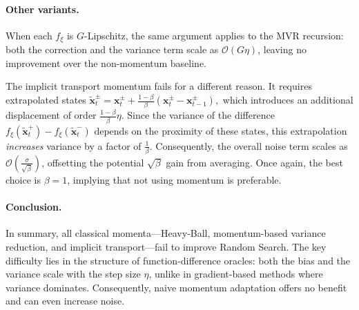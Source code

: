 \documentclass[twoside]{article}
\theoremstyle{plain}
\theoremstyle{definition}
\theoremstyle{remark}
\def\cO{{\mathcal{O}}}
\def\vx{{\bm{x}}}
\begin{document}
\paragraph{Other variants.}
When each $f_\xi$ is $G$-Lipschitz, the same argument applies to the MVR
recursion: both the correction and the variance term scale as
$\cO(G\eta)$, leaving no improvement over the non-momentum baseline.

The implicit transport momentum fails for a different reason.
It requires extrapolated states
\(
\tilde{\vx}_t^\pm = \vx_t^\pm + \tfrac{1-\beta}{\beta}(\vx_t^\pm - \vx_{t-1}^\pm),
\)
which introduces an additional displacement of order
$\tfrac{1-\beta}{\beta}\eta$. Since the variance of the difference
$f_\xi(\tilde{\vx}_t^+) - f_\xi(\tilde{\vx}_t^-)$ depends on the proximity
of these states, this extrapolation \emph{increases} variance by a factor of
$\tfrac{1}{\beta}$. Consequently, the overall noise term scales as
$\cO(\tfrac{\sigma}{\sqrt{\beta}})$, offsetting the potential
$\sqrt{\beta}$ gain from averaging.  
Once again, the best choice is $\beta=1$, implying that not using momentum
is preferable.

\paragraph{Conclusion.}
In summary, all classical momenta---Heavy-Ball, momentum-based variance
reduction, and implicit transport---fail to improve Random Search.  
The key difficulty lies in the structure of function-difference oracles:
both the bias and the variance scale with the step size $\eta$, unlike in
gradient-based methods where variance dominates.  
Consequently, naive momentum adaptation offers no benefit and can even increase
noise.
\end{document}
